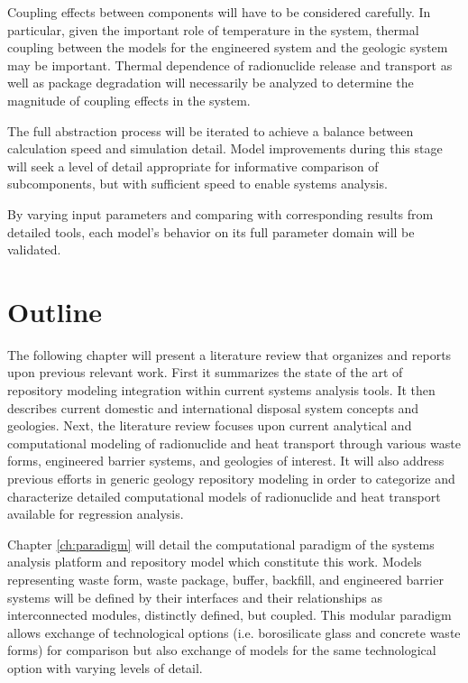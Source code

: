 Coupling effects between components will have to be considered carefully.  In 
particular, given the important role of temperature in the system, thermal 
coupling between the models for the engineered system and the geologic system 
may be important. Thermal dependence of radionuclide release and transport as 
well as package degradation will necessarily be analyzed to determine the 
magnitude of coupling effects in the system.


The full abstraction process will be iterated to achieve a balance between 
calculation speed and simulation detail. Model improvements during this stage 
will seek a
level of detail appropriate for informative comparison of subcomponents, but 
with sufficient speed to enable systems analysis. 


By varying input parameters and comparing with corresponding results from 
detailed tools, each model's behavior on its full parameter domain will be 
validated.


\section{Outline}


The following chapter will present a literature review that organizes and 
reports upon previous relevant work. First it summarizes the state of the art of 
repository modeling integration within current systems analysis tools. It then 
describes current domestic and international disposal system concepts and
geologies.  Next, the literature review focuses upon current analytical and 
computational modeling of radionuclide and heat transport through various waste 
forms, engineered barrier systems, and geologies of interest.  It will also 
address previous efforts in generic geology repository modeling in order to 
categorize and characterize detailed computational models of radionuclide and 
heat transport available for regression analysis.


Chapter \ref{ch:paradigm} will detail the computational paradigm of the \Cyclus 
systems analysis platform and repository model which constitute this work. Models
representing waste form, waste package, buffer, backfill, and engineered barrier 
systems will be defined by their interfaces and their relationships as 
interconnected modules, distinctly defined, but coupled. This modular paradigm 
allows exchange  of technological options (i.e. borosilicate glass and concrete 
waste forms) for comparison but also exchange of models for the same 
technological option with varying levels of detail.

